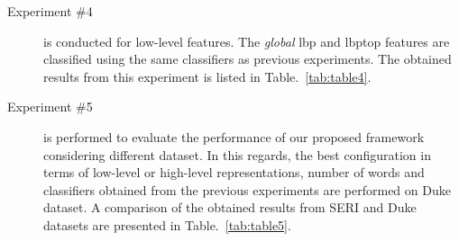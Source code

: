 \begin{description}
\item[Experiment \#4] is conducted for low-level features.
The \emph{global} \ac{lbp} and \ac{lbptop} features are classified using the same classifiers as previous experiments.
The obtained results from this experiment is listed in Table.~\ref{tab:table4}.\\
 
\item[Experiment \#5] is performed to evaluate the performance of our proposed framework considering different dataset.
In this regards, the best configuration in terms of low-level or high-level representations, number of words and classifiers obtained from the previous experiments are performed on Duke dataset.
A comparison of the obtained results from SERI and Duke datasets are presented in Table.~\ref{tab:table5}.
  

\end{description}


